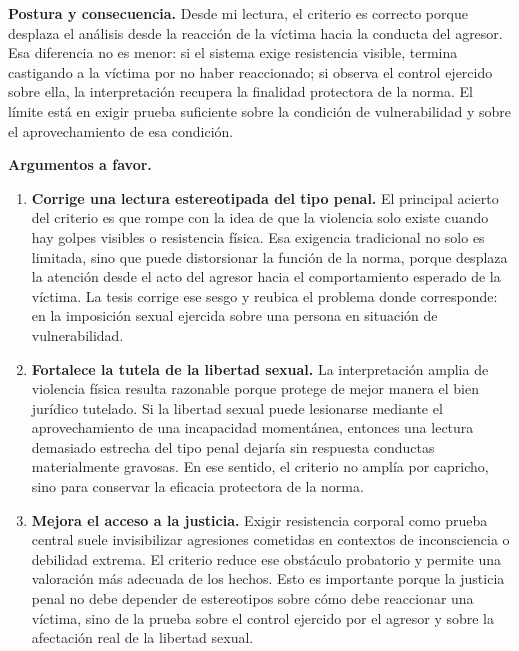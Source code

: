 \documentclass[
	spanish,
	letterpaper, oneside
]{article}
\begin{document}
\textbf{Postura y consecuencia.} Desde mi lectura, el criterio es correcto porque desplaza el análisis desde la reacción de la víctima hacia la conducta del agresor. Esa diferencia no es menor: si el sistema exige resistencia visible, termina castigando a la víctima por no haber reaccionado; si observa el control ejercido sobre ella, la interpretación recupera la finalidad protectora de la norma. El límite está en exigir prueba suficiente sobre la condición de vulnerabilidad y sobre el aprovechamiento de esa condición.

\textbf{Argumentos a favor.}
\begin{enumerate}
	\item \textbf{Corrige una lectura estereotipada del tipo penal.} El principal acierto del criterio es que rompe con la idea de que la violencia solo existe cuando hay golpes visibles o resistencia física. Esa exigencia tradicional no solo es limitada, sino que puede distorsionar la función de la norma, porque desplaza la atención desde el acto del agresor hacia el comportamiento esperado de la víctima. La tesis corrige ese sesgo y reubica el problema donde corresponde: en la imposición sexual ejercida sobre una persona en situación de vulnerabilidad.
	\item \textbf{Fortalece la tutela de la libertad sexual.} La interpretación amplia de violencia física resulta razonable porque protege de mejor manera el bien jurídico tutelado. Si la libertad sexual puede lesionarse mediante el aprovechamiento de una incapacidad momentánea, entonces una lectura demasiado estrecha del tipo penal dejaría sin respuesta conductas materialmente gravosas. En ese sentido, el criterio no amplía por capricho, sino para conservar la eficacia protectora de la norma.
	\item \textbf{Mejora el acceso a la justicia.} Exigir resistencia corporal como prueba central suele invisibilizar agresiones cometidas en contextos de inconsciencia o debilidad extrema. El criterio reduce ese obstáculo probatorio y permite una valoración más adecuada de los hechos. Esto es importante porque la justicia penal no debe depender de estereotipos sobre cómo debe reaccionar una víctima, sino de la prueba sobre el control ejercido por el agresor y sobre la afectación real de la libertad sexual.
\end{enumerate}
\end{document}
